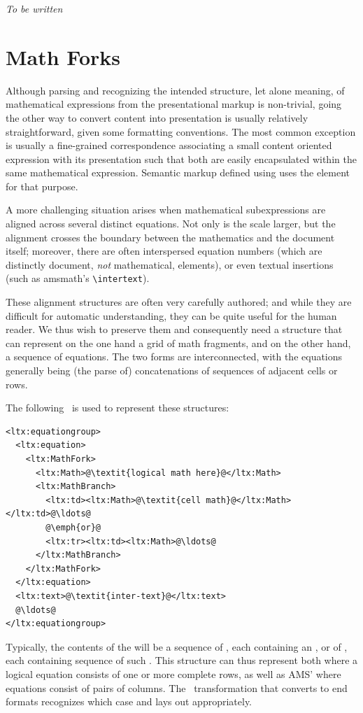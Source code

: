 \documentclass{book}
\begin{document}
\emph{To be written}

\section{Math Forks}\label{mathfork}
Although parsing and recognizing the intended structure, let alone meaning,
of mathematical expressions from the presentational markup is non-trivial,
going the other way to convert content into presentation
is usually relatively straightforward, given some formatting conventions.
The most common exception is usually a fine-grained correspondence
associating a small content oriented expression with its presentation
such that both are easily encapsulated within the same mathematical expression.
Semantic markup defined using  uses the  element
for that purpose.

A more challenging situation arises when mathematical subexpressions
are aligned across several distinct equations.
Not only is the scale larger, but the alignment crosses the boundary
between the mathematics and the document itself; moreover,
there are often interspersed equation numbers
(which are distinctly document,  \emph{not} mathematical, elements),
or even textual insertions (such as amsmath's \verb|\intertext|).

These alignment structures are often very carefully authored;
and while they are difficult for automatic understanding,
they can be quite useful for the human reader.
We thus wish to preserve them and consequently need a structure that can represent 
on the one hand a grid of math fragments,
and on the other hand, a sequence of equations.
The two forms are interconnected, with the equations generally
being (the parse of) concatenations of sequences of adjacent
cells or rows.

The following \XML\ is used to represent these structures:
\begin{lstlisting}[style=xml]
<ltx:equationgroup>
  <ltx:equation>
    <ltx:MathFork>
      <ltx:Math>@\textit{logical math here}@</ltx:Math>
      <ltx:MathBranch>
        <ltx:td><ltx:Math>@\textit{cell math}@</ltx:Math></ltx:td>@\ldots@
        @\emph{or}@
        <ltx:tr><ltx:td><ltx:Math>@\ldots@
      </ltx:MathBranch>
    </ltx:MathFork>
  </ltx:equation>
  <ltx:text>@\textit{inter-text}@</ltx:text>
  @\ldots@
</ltx:equationgroup>
\end{lstlisting}
Typically, the contents of the  will be a sequence
of , each containing an , or
of , each containing sequence of such .
This structure can thus represent both  where a logical
equation consists of one or more complete rows, as well as
AMS'  where equations consist of pairs of columns.
The \XSLT\ transformation that converts to end formats recognizes
which case and lays out appropriately.
\end{document}

